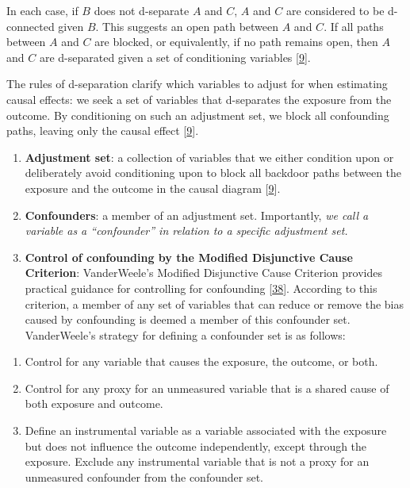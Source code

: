 \documentclass[
  singlecolumn]{article}
\providecommand{\tightlist}{%
  \setlength{\itemsep}{0pt}\setlength{\parskip}{0pt}}\usepackage{longtable,booktabs,array}
\begin{document}
In each case, if \(B\) does not d-separate \(A\) and \(C\), \(A\) and
\(C\) are considered to be d-connected given \(B\). This suggests an
open path between \(A\) and \(C\). If all paths between \(A\) and \(C\)
are blocked, or equivalently, if no path remains open, then \(A\) and
\(C\) are d-separated given a set of conditioning variables
{[}\protect\hyperlink{ref-pearl2009}{9}{]}.

The rules of d-separation clarify which variables to adjust for when
estimating causal effects: we seek a set of variables that d-separates
the exposure from the outcome. By conditioning on such an adjustment
set, we block all confounding paths, leaving only the causal effect
{[}\protect\hyperlink{ref-pearl2009}{9}{]}.

\begin{enumerate}
\def\labelenumi{\arabic{enumi}.}
\setcounter{enumi}{4}
\item
  \textbf{Adjustment set}: a collection of variables that we either
  condition upon or deliberately avoid conditioning upon to block all
  backdoor paths between the exposure and the outcome in the causal
  diagram {[}\protect\hyperlink{ref-pearl2009}{9}{]}.
\item
  \textbf{Confounders}: a member of an adjustment set. Importantly,
  \emph{we call a variable as a ``confounder'' in relation to a specific
  adjustment set.}
\item
  \textbf{Control of confounding by the Modified Disjunctive Cause
  Criterion}: VanderWeele's Modified Disjunctive Cause Criterion
  provides practical guidance for controlling for confounding
  {[}\protect\hyperlink{ref-vanderweele2019}{38}{]}. According to this
  criterion, a member of any set of variables that can reduce or remove
  the bias caused by confounding is deemed a member of this confounder
  set. VanderWeele's strategy for defining a confounder set is as
  follows:
\end{enumerate}

\begin{enumerate}
\def\labelenumi{\alph{enumi}.}
\tightlist
\item
  Control for any variable that causes the exposure, the outcome, or
  both.
\item
  Control for any proxy for an unmeasured variable that is a shared
  cause of both exposure and outcome.
\item
  Define an instrumental variable as a variable associated with the
  exposure but does not influence the outcome independently, except
  through the exposure. Exclude any instrumental variable that is not a
  proxy for an unmeasured confounder from the confounder set.
\end{enumerate}
\end{document}
